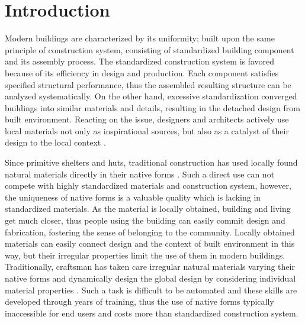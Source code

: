 \section{Introduction}
Modern buildings are characterized by its uniformity; built upon the same principle of construction system, consisting of standardized building component and its assembly process.
The standardized construction system is favored because of its efficiency in design and production.
Each component satisfies specified structural performance, thus the assembled resulting structure can be analyzed systematically.
On the other hand, excessive standardization converged buildings into similar materials and details, resulting in the detached design from built environment.
Reacting on the issue, designers and architects actively use local materials not only as inspirational sources, but also as a catalyst of their design to the local context \cite{oliver1997encyclopedia}.

Since primitive shelters and huts, traditional construction has used locally found natural materials directly in their native forms \cite{weston2003materials}.
Such a direct use can not compete with highly standardized materials and construction system, however, the uniqueness of native forms is a valuable quality which is lacking in standardized materials.
As the material is locally obtained, building and living get much closer, thus people using the building can easily commit design and fabrication, fostering the sense of belonging to the community.
Locally obtained materials can easily connect design and the context of built environment in this way, but their irregular properties limit the use of them in modern buildings.
Traditionally, craftsman has taken care irregular natural materials varying their native forms and dynamically design the global design by considering individual material properties \cite{pye1968nature}.
Such a task is difficult to be automated and these skills are developed through years of training, thus the use of native forms typically inaccessible for end users and costs more than standardized construction system. \\

